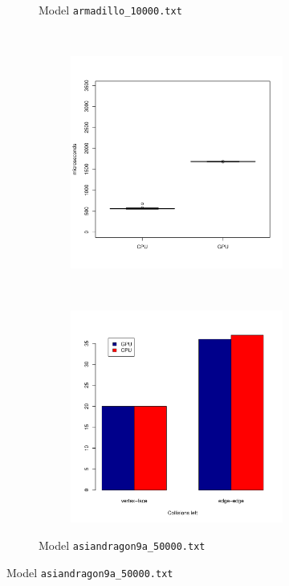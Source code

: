 \begin{figure}
\begin{subfigure}[b]{0.45\textwidth}
\begin{subfigure}[b]{0.45\textwidth}
			\end{subfigure}
			\caption{Model \texttt{armadillo\_10000.txt}}
		\end{subfigure}
		~%
		\begin{subfigure}[b]{0.45\textwidth}
			\begin{subfigure}[b]{0.45\textwidth}
				\includegraphics[width=\textwidth]{results/time/asiandragon9a_50000}
			\end{subfigure}
			~%
			\begin{subfigure}[b]{0.45\textwidth}
				\includegraphics[width=\textwidth]{results/correctness/asiandragon9a_50000}
			\end{subfigure}
			\caption{Model \texttt{asiandragon9a\_50000.txt}}
		\end{subfigure}
		

\end{figure}
